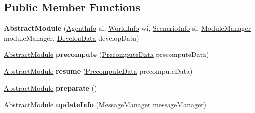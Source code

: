 \subsection*{Public Member Functions}
\begin{DoxyCompactItemize}
\item 
\hypertarget{classadf_1_1component_1_1module_1_1AbstractModule_a78b7aca7664343cd591f726b3b495e2d}{}\label{classadf_1_1component_1_1module_1_1AbstractModule_a78b7aca7664343cd591f726b3b495e2d} 
{\bfseries Abstract\+Module} (\hyperlink{classadf_1_1agent_1_1info_1_1AgentInfo}{Agent\+Info} ai, \hyperlink{classadf_1_1agent_1_1info_1_1WorldInfo}{World\+Info} wi, \hyperlink{classadf_1_1agent_1_1info_1_1ScenarioInfo}{Scenario\+Info} si, \hyperlink{classadf_1_1agent_1_1module_1_1ModuleManager}{Module\+Manager} module\+Manager, \hyperlink{classadf_1_1agent_1_1develop_1_1DevelopData}{Develop\+Data} develop\+Data)
\item 
\hypertarget{classadf_1_1component_1_1module_1_1AbstractModule_a26caa8a0a250dafb548c1a5d038597e7}{}\label{classadf_1_1component_1_1module_1_1AbstractModule_a26caa8a0a250dafb548c1a5d038597e7} 
\hyperlink{classadf_1_1component_1_1module_1_1AbstractModule}{Abstract\+Module} {\bfseries precompute} (\hyperlink{classadf_1_1agent_1_1precompute_1_1PrecomputeData}{Precompute\+Data} precompute\+Data)
\item 
\hypertarget{classadf_1_1component_1_1module_1_1AbstractModule_a2bcfc3ab4e5d5764a0cce91580fa6811}{}\label{classadf_1_1component_1_1module_1_1AbstractModule_a2bcfc3ab4e5d5764a0cce91580fa6811} 
\hyperlink{classadf_1_1component_1_1module_1_1AbstractModule}{Abstract\+Module} {\bfseries resume} (\hyperlink{classadf_1_1agent_1_1precompute_1_1PrecomputeData}{Precompute\+Data} precompute\+Data)
\item 
\hypertarget{classadf_1_1component_1_1module_1_1AbstractModule_af5c01c6d5397d0a87b556e28827b2508}{}\label{classadf_1_1component_1_1module_1_1AbstractModule_af5c01c6d5397d0a87b556e28827b2508} 
\hyperlink{classadf_1_1component_1_1module_1_1AbstractModule}{Abstract\+Module} {\bfseries preparate} ()
\item 
\hypertarget{classadf_1_1component_1_1module_1_1AbstractModule_aae6d14c3a06546d71a33d1108962cd0a}{}\label{classadf_1_1component_1_1module_1_1AbstractModule_aae6d14c3a06546d71a33d1108962cd0a} 
\hyperlink{classadf_1_1component_1_1module_1_1AbstractModule}{Abstract\+Module} {\bfseries update\+Info} (\hyperlink{classadf_1_1agent_1_1communication_1_1MessageManager}{Message\+Manager} message\+Manager)
\item 

\end{DoxyCompactItemize}
